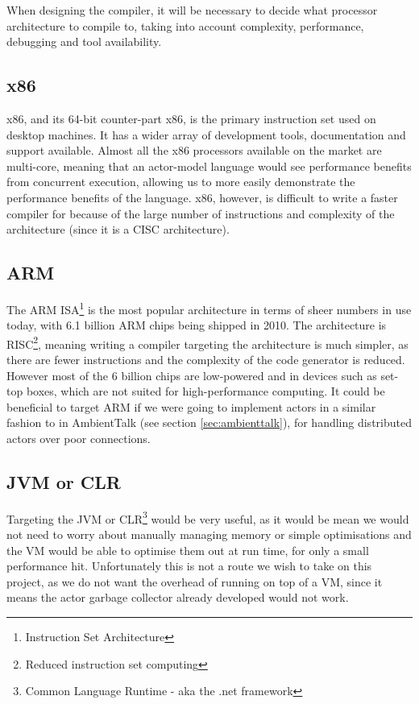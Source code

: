 \documentclass{article}
\begin{document}
When designing the compiler, it will be necessary to decide what processor architecture to compile to, taking into account complexity, performance, debugging and tool availability.

\subsection{x86}

x86, and its 64-bit counter-part x86, is the primary instruction set used on desktop machines. It has a wider array of development tools, documentation and support available.
Almost all the x86 processors available on the market are multi-core, meaning that an actor-model language would see performance benefits from concurrent execution, allowing us to more easily demonstrate the performance benefits of the language.
x86, however, is difficult to write a faster compiler for because of the large number of instructions and complexity of the architecture (since it is a CISC architecture).

\subsection{ARM}

The ARM ISA\footnote{Instruction Set Architecture} is the most popular architecture in terms of sheer numbers in use today, with 6.1 billion ARM chips being shipped in 2010\cite{theregister2011}.
The architecture is RISC\footnote{Reduced instruction set computing}, meaning writing a compiler targeting the architecture is much simpler, as there are fewer instructions and the complexity of the code generator is reduced.
However most of the 6 billion chips are low-powered and in devices such as set-top boxes, which are not suited for high-performance computing. It could be beneficial to target ARM if we were going to implement actors in a similar fashion to in AmbientTalk (see section \ref{sec:ambienttalk}), for handling distributed actors over poor connections.

\subsection{JVM or CLR}

Targeting the JVM or CLR\footnote{Common Language Runtime - aka the .net framework} would be very useful, as it would be mean we would not need to worry about manually managing memory or simple optimisations and the VM would be able to optimise them out at run time, for only a small performance hit.
Unfortunately this is not a route we wish to take on this project, as we do not want the overhead of running on top of a VM, since it means the actor garbage collector already developed would not work.
\end{document}
